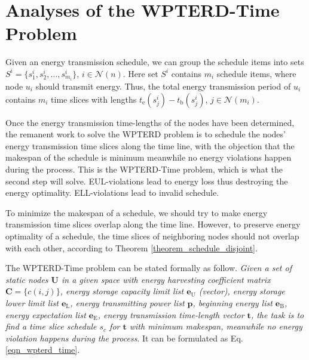 \documentclass[journal,10pt]{IEEEtran}
\begin{document}
\section{Analyses of the WPTERD-Time Problem}
\label{sec_wpter_time}
Given an energy transmission schedule, we can group the schedule items into sets $S^{i}{=}\{s^{i}_1, s^{i}_2, \ldots, s^{i}_{m_i}\}$, $i{\in}\mathcal{N}(n)$. Here set $S^{i}$ contains $m_i$ schedule items, where node $u_i$ should transmit energy. Thus, the total energy transmission period of $u_i$ contains $m_i$ time slices with lengths $t_\text{e}(s^{i}_j){-}t_\text{b}(s^{i}_j)$, $j{\in}\mathcal{N}(m_i)$.

Once the energy transmission time-lengths of the nodes have been determined, the remanent work to solve the WPTERD problem is to schedule the nodes' energy transmission time slices along the time line, with the objection that the makespan of the schedule is minimum meanwhile no energy violations happen during the process. This is the WPTERD-Time problem, which is what the second step will solve. EUL-violations lead to energy loss thus destroying the energy optimality. ELL-violations lead to invalid schedule.

To minimize the makespan of a schedule, we should try to make energy transmission time slices overlap along the time line. However, to preserve energy optimality of a schedule, the time slices of neighboring nodes should not overlap with each other, according to Theorem \ref{theorem_schedule_disjoint}.

The WPTERD-Time problem can be stated formally as follow. \textit{Given a set of static nodes $\textbf{U}$ in a given space with energy harvesting coefficient matrix $\mathbf{C}{=}\{c(i,j)\}$, energy storage capacity limit list $\textbf{e}_\text{U}$ (vector), energy storage lower limit list $\textbf{e}_\text{L}$, energy transmitting power list $\textbf{p}$, beginning energy list $\textbf{e}_\text{B}$, energy expectation list $\textbf{e}_\text{E}$, energy transmission time-length vector $\textbf{t}$, the task is to find a time slice schedule $s_c$ for $\textbf{t}$ with minimum makespan, meanwhile no energy violation happens during the process}. It can be formulated as Eq.\eqref{eqn_wpterd_time}.
\end{document}
